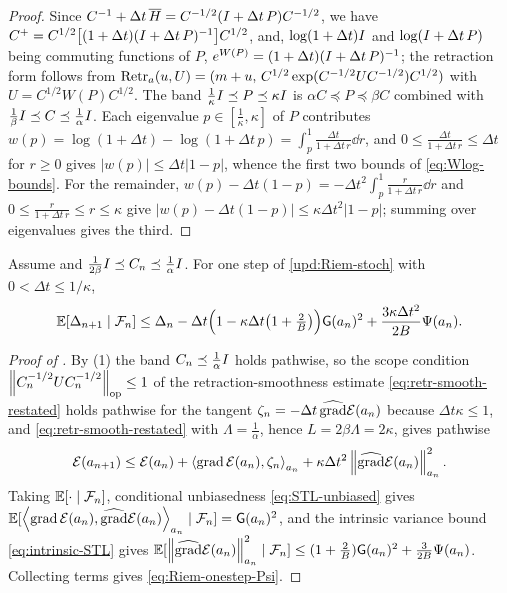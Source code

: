 \begin{proof}
Since $C^{-1}+\Delta t\,\overline H=C^{-1/2}(I+\Delta t\,P)C^{-1/2}$, we have
$C^+=C^{1/2}\bigl[(1+\Delta t)(I+\Delta t\,P)^{-1}\bigr]C^{1/2}$, and, $\log(1+\Delta t)I$ and
$\log(I+\Delta t\,P)$ being commuting functions of $P$,
$e^{W(P)}=(1+\Delta t)(I+\Delta t\,P)^{-1}$; the retraction form follows from
$\operatorname{Retr}_a(u,U)=(m+u,\,C^{1/2}\exp(C^{-1/2}UC^{-1/2})C^{1/2})$ with $U=C^{1/2}W(P)C^{1/2}$. The band
$\tfrac1\kappa I\preceq P\preceq\kappa I$ is $\alpha C\preceq P\preceq\beta C$ combined with
$\tfrac1\beta I\preceq C\preceq\tfrac1\alpha I$. Each eigenvalue $p\in[\tfrac1\kappa,\kappa]$ of $P$
contributes $w(p)=\log(1+\Delta t)-\log(1+\Delta t\,p)=\int_p^1\tfrac{\Delta t}{1+\Delta t\,r}\dd r$, and
$0\leq\tfrac{\Delta t}{1+\Delta t\,r}\leq\Delta t$ for $r\geq0$ gives $|w(p)|\leq\Delta t|1-p|$, whence
the first two bounds of \eqref{eq:Wlog-bounds}. For the remainder,
$w(p)-\Delta t(1-p)=-\Delta t^2\int_p^1\tfrac r{1+\Delta t\,r}\dd r$ and $0\leq\tfrac r{1+\Delta t\,r}\leq r\leq\kappa$
give $|w(p)-\Delta t(1-p)|\leq\kappa\Delta t^2|1-p|$; summing over eigenvalues gives the third.
\end{proof}

\begin{lemma}
\label{lem:onestep-stoch-Riem}
Assume  and $\tfrac1{2\beta}I\preceq C_n\preceq\tfrac1\alpha I$. For
one step of \eqref{upd:Riem-stoch} with $0<\Delta t\leq1/\kappa$,
\begin{equation}
\label{eq:Riem-onestep-Psi}
    \mathbb{E}[\Delta_{n+1}\mid\mathcal{F}_n]
    \leq\Delta_n-\Delta t\Bigl(1-\kappa\Delta t\bigl(1+\tfrac2B\bigr)\Bigr)\mathsf{G}(a_n)^2
    +\frac{3\kappa\Delta t^2}{2B}\Psi(a_n).
\end{equation}
\end{lemma}

\begin{proof}[Proof of ]
By (1) the band $C_n\preceq\tfrac1\alpha I$ holds pathwise, so the scope
condition $\left\lVert C_n^{-1/2}UC_n^{-1/2}\right\rVert_{\mathrm{op}}\leq1$ of the retraction-smoothness estimate
\eqref{eq:retr-smooth-restated} holds pathwise for the tangent
$\zeta_n=-\Delta t\,\widehat{\operatorname{grad}}\mathcal{E}(a_n)$ because $\Delta t\kappa\leq1$, and
\eqref{eq:retr-smooth-restated} with $\Lambda=\tfrac1\alpha$, hence $L=2\beta\Lambda=2\kappa$, gives
pathwise
\[
    \mathcal{E}(a_{n+1})\leq\mathcal{E}(a_n)+\left\langle \operatorname{grad}\mathcal{E}(a_n),\zeta_n\right\rangle_{a_n}+\kappa\Delta t^2\left\lVert \widehat{\operatorname{grad}}\mathcal{E}(a_n)\right\rVert_{a_n}^2 .
\]
Taking $\mathbb{E}[\cdot\mid\mathcal{F}_n]$, conditional unbiasedness \eqref{eq:STL-unbiased} gives
$\mathbb{E}[\left\langle \operatorname{grad}\mathcal{E}(a_n),\widehat{\operatorname{grad}}\mathcal{E}(a_n)\right\rangle_{a_n}\mid\mathcal{F}_n]=\mathsf{G}(a_n)^2$, and the
intrinsic variance bound \eqref{eq:intrinsic-STL} gives
$\mathbb{E}[\left\lVert \widehat{\operatorname{grad}}\mathcal{E}(a_n)\right\rVert_{a_n}^2\mid\mathcal{F}_n]\leq(1+\tfrac2B)\mathsf{G}(a_n)^2+\tfrac3{2B}\Psi(a_n)$.
Collecting terms gives \eqref{eq:Riem-onestep-Psi}.
\end{proof}

